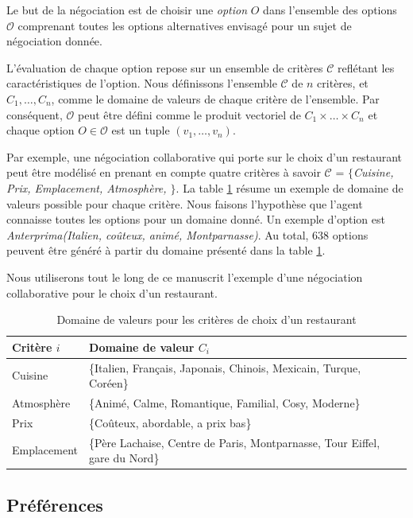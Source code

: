Le but de la négociation est de choisir une \textit{option} $O$ dans l'ensemble des options $\mathcal{O}$ comprenant toutes les options alternatives envisagé pour un sujet de négociation donnée. 

L'évaluation de chaque option repose sur un ensemble de critères $\mathcal{C}$ reflétant les caractéristiques de l'option. Nous définissons l'ensemble $\mathcal{C}$ de $n$ critères, et $C_1,\ldots,C_n$, comme le domaine de valeurs de chaque critère de l'ensemble. 
Par conséquent, $\mathcal{O}$ peut être défini comme le produit vectoriel de  $C_1\times\ldots\times C_n$ et chaque option $O \in \mathcal{O}$ est un tuple $(v_1,\ldots,v_n)$. 

Par exemple, une négociation collaborative qui porte sur le choix d'un restaurant peut être modélisé en prenant en compte quatre critères à savoir $\mathcal{C}$ = \emph{$\{$Cuisine, Prix, Emplacement, Atmosphère, $\}$}. La table \ref{tab:domain} résume un exemple de domaine de valeurs possible pour chaque critère. Nous faisons l'hypothèse que l'agent connaisse toutes les options pour un domaine donné. Un exemple d'option est  \emph{Anterprima(Italien, coûteux, animé, Montparnasse)}. Au total, $638$ options peuvent être généré à partir du domaine présenté dans la table \ref{tab:domain}. 

Nous utiliserons tout le long de ce manuscrit l'exemple d'une négociation collaborative pour le choix d'un restaurant. 
\begin{table}[h]
	\centering
	\begin{tabular}{ >{\centering\arraybackslash}m{2.25cm}  >{\centering\arraybackslash}m{8.6cm}}
		\hline
		\hline
		\textbf{Critère $i $} &\textbf{ Domaine de valeur $C_i$} \\
		\hline
		Cuisine & \{Italien, Français, Japonais, Chinois, Mexicain, Turque, Coréen\} \\
		\hline
		Atmosphère & \{Animé, Calme, Romantique, Familial, Cosy, Moderne\} \\
		\hline
		Prix & \{Coûteux, abordable, a prix bas\} \\
		\hline
		Emplacement & \{Père Lachaise, Centre de Paris, Montparnasse, Tour Eiffel, gare du Nord\} \\
		\hline
		\hline
	\end{tabular}
	\caption{Domaine de valeurs pour les critères de choix d'un restaurant} 
	\label{tab:domain}
\end{table}


\subsection{Préférences}

